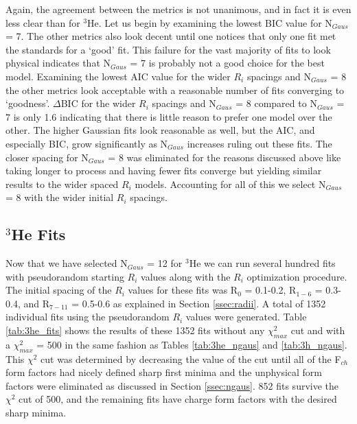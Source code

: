 Again, the agreement between the metrics is not unanimous, and in fact it is even less clear than for $^3$He. Let us begin by examining the lowest BIC value for N$_{Gaus}$ = 7. The other metrics also look decent until one notices that only one fit met the standards for a `good' fit. This failure for the vast majority of fits to look physical indicates that N$_{Gaus}$ = 7 is probably not a good choice for the best model. Examining the lowest AIC value for the wider $R_i$ spacings and N$_{Gaus}$ = 8 the other metrics look acceptable with a reasonable number of fits converging to `goodness'. $\Delta$BIC for the wider $R_i$ spacings and N$_{Gaus}$ = 8 compared to N$_{Gaus}$ = 7 is only 1.6 indicating that there is little reason to prefer one model over the other. The higher Gaussian fits look reasonable as well, but the AIC, and especially BIC, grow significantly as N$_{Gaus}$ increases ruling out these fits. The closer spacing for N$_{Gaus}$ = 8 was eliminated for the reasons discussed above like taking longer to process and having fewer fits converge but yielding similar results to the wider spaced $R_i$ models. Accounting for all of this we select N$_{Gaus}$ = 8 with the wider initial $R_i$ spacings.

\subsection{$^3$He Fits}
\label{ssec:3he_fits}

Now that we have selected N$_{Gaus}$ = 12 for $^3$He we can run several hundred fits with pseudorandom starting $R_i$ values along with the $R_i$ optimization procedure. The initial spacing of the $R_i$ values for these fits was R$_0$ = 0.1-0.2, R$_{1-6}$ = 0.3-0.4, and R$_{7-11}$ = 0.5-0.6 as explained in Section \ref{ssec:radii}. A total of 1352 individual fits using the pseudorandom $R_i$ values were generated. Table \ref{tab:3he_fits} shows the results of these 1352 fits without any $\chi^2_{max}$ cut and with a $\chi^2_{max}$ = 500 in the same fashion as Tables \ref{tab:3he_ngaus} and \ref{tab:3h_ngaus}. This $\chi^2$ cut was determined by decreasing the value of the cut until all of the F$_{ch}$ form factors had nicely defined sharp first minima and the unphysical form factors were eliminated as discussed in Section \ref{ssec:ngaus}. 852 fits survive the $\chi^2$ cut of 500, and the remaining fits have charge form factors with the desired sharp minima.

